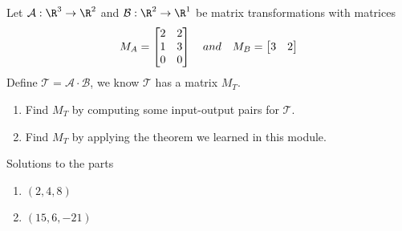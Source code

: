 \begin{exercises}
\begin{problist}
		\prob Let $\mathcal A: \R^3 \to \R^2$ and $\mathcal B: \R^2 \to \R^1$ be matrix transformations with matrices
		\[
		    M_A = \begin{bmatrix}2&2\\1&3\\0&0\end{bmatrix} \quad and \quad M_B = \begin{bmatrix}3&2\end{bmatrix}
		\]
		Define $\mathcal T = \mathcal A \cdot \mathcal B$, we know $\mathcal T$ has a matrix $M_T$. 
		\begin{enumerate}
		    \item Find $M_T$ by computing some input-output pairs for $\mathcal T$.
		    \item Find $M_T$ by applying the theorem we learned in this module. 
		\end{enumerate}
		    
		
		
		\begin{solution}
		Solutions to the parts
			\begin{enumerate}
				\item   $(2,4,8)$
				\item   $(15,6,-21)$
			\end{enumerate}
		\end{solution}

	\end{problist}
\end{exercises}
